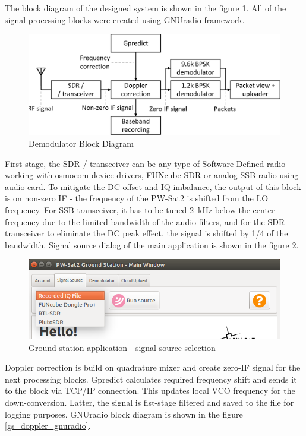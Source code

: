 The block diagram of the designed system is shown in the figure \ref{demodulator_block_diagram}. All of the signal processing blocks were created using GNUradio framework.

\begin{figure}
    \centering
    \includegraphics[width=0.6\paperwidth]{img/5/demodulator_block_diagram.pdf}
    \caption{Demodulator Block Diagram}
    \label{demodulator_block_diagram}
\end{figure}

First stage, the SDR / transceiver can be any type of Software-Defined radio working with osmocom device drivers, FUNcube SDR or analog SSB radio using audio card. To mitigate the DC-offset and IQ imbalance, the output of this block is on non-zero IF - the frequency of the PW-Sat2 is shifted from the LO frequency. For SSB transceiver, it has to be tuned \SI{2}{\kHz} below the center frequency due to the limited bandwidth of the audio filters, and for the SDR transceiver to eliminate the DC peak effect, the signal is shifted by 1/4 of the bandwidth. Signal source dialog of the main application is shown in the figure \ref{gs_source_selection}.

\begin{figure}
    \centering
    \includegraphics[width=0.6\paperwidth]{img/5/gs_source_selection.png}
    \caption{Ground station application - signal source selection}
    \label{gs_source_selection}
\end{figure}

Doppler correction is build on quadrature mixer and create zero-IF signal for the next processing blocks. Gpredict calculates required frequency shift and sends it to the block via TCP/IP connection. This updates local VCO frequency for the down-conversion. Latter, the signal is fist-stage filtered and saved to the file for logging purposes. GNUradio block diagram is shown in the figure \ref{gs_doppler_gnuradio}.

